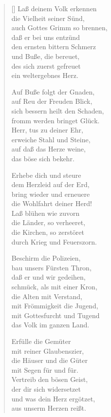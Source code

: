 \begin{multicols}{2}
\begin{verse}[\versewidth]
 Laß deinem Volk erkennen\\
die Vielheit seiner Sünd,\\
auch Gottes Grimm so brennen,\\
daß er bei uns entzünd\\
den ernsten bittern Schmerz\\
und Buße, die bereuet,\\
des sich zuerst gefreuet\\
ein weltergebnes Herz.

 Auf Buße folgt der Gnaden,\\
auf Reu der Freuden Blick,\\
sich bessern heilt den Schaden,\\
fromm werden bringet Glück.\\
Herr, tus zu deiner Ehr,\\
erweiche Stahl und Steine,\\
auf daß das Herze weine,\\
das böse sich bekehr.

 Erhebe dich und steure\\
dem Herzleid auf der Erd,\\
bring wieder und erneuere\\
die Wohlfahrt deiner Herd!\\
Laß blühen wie zuvorn\\
die Länder, so verheeret,\\
die Kirchen, so zerstöret\\
durch Krieg und Feuerszorn.

 Beschirm die Polizeien,\\
bau unsers Fürsten Thron,\\
daß er und wir gedeihen,\\
schmück, als mit einer Kron,\\
die Alten mit Verstand,\\
mit Frömmigkeit die Jugend,\\
mit Gottesfurcht und Tugend\\
das Volk im ganzen Land.

 Erfülle die Gemüter\\
mit reiner Glaubenszier,\\
die Häuser und die Güter\\
mit Segen für und für.\\
Vertreib den bösen Geist,\\
der dir sich widersetzet\\
und was dein Herz ergötzet,\\
aus unserm Herzen reißt.


\end{verse}
\end{multicols}
